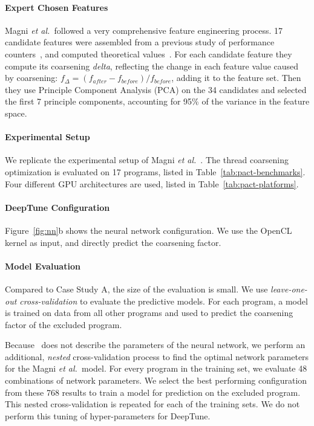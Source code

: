 

\paragraph{Expert Chosen Features} Magni \emph{et al.\ }followed a very
comprehensive feature engineering process. 17 candidate features were assembled
from a previous study of performance counters~\cite{Magni2}, and computed
theoretical values~\cite{Sim2012}. For each candidate feature they compute its
coarsening \emph{delta}, reflecting the change in each feature value caused by
coarsening: $f_{\Delta} = (f_{after} - f_{before}) / f_{before}$, adding it to
the feature set. Then they use Principle Component Analysis (PCA) on the 34
candidates and selected the first 7 principle components, accounting for 95\% of
the variance in the feature space.

\paragraph{Experimental Setup} We replicate the experimental setup of Magni
\emph{et al.}~\cite{Magni2014}. The thread coarsening optimization is evaluated
on 17 programs, listed in Table~\ref{tab:pact-benchmarks}. Four different GPU
architectures are used, listed in Table~\ref{tab:pact-platforms}.

\paragraph{DeepTune Configuration} Figure~\ref{fig:nn}b shows the neural network
configuration. We use the OpenCL kernel as input, and directly predict the
coarsening factor.

\paragraph{Model Evaluation} Compared to Case Study A, the size of the
evaluation is small. We use \emph{leave-one-out cross-validation} to evaluate
the predictive models. For each program, a model is trained on data from all
other programs and used to predict the coarsening factor of the excluded
program.

Because~\cite{Magni2014} does not describe the parameters of the neural network,
we perform an additional, \emph{nested} cross-validation process to find the
optimal network parameters for the Magni \emph{et al.\ }model. For every program
in the training set, we evaluate 48 combinations of network parameters. We
select the best performing configuration from these 768 results to train a model
for prediction on the excluded program. This nested cross-validation is repeated
for each of the training sets. We do not perform this tuning of hyper-parameters
for DeepTune.


